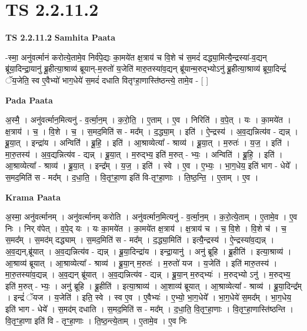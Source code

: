 \documentclass[17pt]{extarticle}
\begin{document}
\section{ TS 2.2.11.2 }

\textbf{TS 2.2.11.2 } \newline
\textbf{Samhita Paata} \newline

-स्मा॒ अनु॑वर्त्मानं करोत्ये॒तामे॒व निर्व॑पे॒द्यः का॒मये॑त क्ष॒त्राय॑ च वि॒शे च॑ स॒मदं॑ दद्ध्या॒मित्यै॒न्द्रस्या॑-व॒द्यन् ब्रू॑या॒दिन्द्रा॒यानु॑ ब्रू॒हीत्या॒श्राव्य॑ ब्रूयान्-म॒रुतो॑ य॒जेति॑ मारु॒तस्या॑व॒द्यन् ब्रू॑यान्म॒रुद्भ्योऽनु॑ ब्रू॒हीत्या॒श्राव्य॑ ब्रूया॒दिन्द्रं॑ ॅय॒जेति॒ स्व ए॒वैभ्यो॑ भाग॒धेये॑ स॒मदं॑ दधाति वितृꣳहा॒णास्ति॑ष्ठन्त्ये॒ तामे॒व - [  ] \newline

\textbf{Pada Paata} \newline

अ॒स्मै॒ । अनु॑वर्त्मान॒मित्यनु॑ - व॒र्त्मा॒न॒म् । क॒रो॒ति॒ । ए॒ताम् । ए॒व । निरिति॑ । व॒पे॒त् । यः । का॒मये॑त । क्ष॒त्राय॑ । च॒ । वि॒शे । च॒ । स॒मद॒मिति॑ स - मद᳚म् । द॒द्ध्या॒म् । इति॑ । ऐ॒न्द्रस्य॑ । अ॒व॒द्यन्नित्य॑व - द्यन्न् । ब्रू॒या॒त् । इन्द्रा॑य । अन्विति॑॑ । ब्रू॒हि॒ । इति॑ । आ॒श्राव्येत्या᳚ - श्राव्य॑ । ब्रू॒या॒त् । म॒रुतः॑ । य॒ज॒ । इति॑ । मा॒रु॒तस्य॑ । अ॒व॒द्यन्नित्य॑व - द्यन्न् । ब्रू॒या॒त् । म॒रुद्भ्य॒ इति॑ म॒रुत् - भ्यः॒ । अन्विति॑ । ब्रू॒हि॒ । इति॑ । आ॒श्राव्येत्या᳚ - श्राव्य॑ । ब्रू॒या॒त् । इन्द्र᳚म् । य॒ज॒ । इति॑ । स्वे । ए॒व । ए॒भ्यः॒ । भा॒ग॒धेय॒ इति॑ भाग - धेये᳚ । स॒मद॒मिति॑ स - मद᳚म् । द॒धा॒ति॒ । वि॒तृꣳ॒॒हा॒णा इति॑ वि-तृꣳ॒॒हा॒णाः । ति॒ष्ठ॒न्ति॒ । ए॒ताम् । ए॒व ।  \newline


\textbf{Krama Paata} \newline

अ॒स्मा॒ अनु॑वर्त्मानम् । अनु॑वर्त्मानम् करोति । अनु॑वर्त्मान॒मित्यनु॑ - व॒र्त्मा॒न॒म् । क॒रो॒त्ये॒ताम् । ए॒तामे॒व । ए॒व निः । निर् व॑पेत् । व॒पे॒द् यः । यः का॒मये॑त । का॒मये॑त क्ष॒त्राय॑ । क्ष॒त्राय॑ च । च॒ वि॒शे । वि॒शे च॑ । च॒ स॒मद᳚म् । स॒मद॑म् दद्ध्याम् । स॒मद॒मिति॑ स - मद᳚म् । द॒द्ध्या॒मिति॑ । इत्यै॒न्द्रस्य॑ । ऐ॒न्द्रस्या॑व॒द्यन्न् । अ॒व॒द्यन्,ब्रू॑यात् । अ॒व॒द्यन्नित्य॑व - द्यन्न् । ब्रू॒या॒दिन्द्रा॑य । इन्द्रा॒यानु॑ । अनु॑ ब्रूहि । ब्रू॒हीति॑ । इत्या॒श्राव्य॑ । आ॒श्राव्य॑ ब्रूयात् । आ॒श्राव्येत्या᳚ - श्राव्य॑ । ब्रू॒या॒न् म॒रुतः॑ । म॒रुतो॑ यज । य॒जेति॑ । इति॑ मारु॒तस्य॑ । मा॒रु॒तस्या॑व॒द्यन्न् । अ॒व॒द्यन् ब्रू॑यात् । अ॒व॒द्यन्नित्य॑व - द्यन्न् । ब्रू॒या॒न् म॒रुद्भ्यः॑ । म॒रुद्भ्यो ऽनु॑ । म॒रुद्भ्य॒ इति॑ म॒रुत् - भ्यः॒ । अनु॑ ब्रूहि । ब्रू॒हीति॑ । इत्या॒श्राव्य॑ । आ॒शाव्य॑ ब्रूयात् । आ॒श्राव्येत्या᳚ - श्राव्य॑ । ब्रू॒या॒दिन्द्र᳚म् । इन्द्रं॑ ॅयज । य॒जेति॑ । इति॒ स्वे । स्व ए॒व । ए॒वैभ्यः॑ । ए॒भ्यो॒ भा॒ग॒धेये᳚ । भा॒ग॒धेये॑ स॒मद᳚म् । भा॒ग॒धेय॒ इति॑ भाग - धेये᳚ । स॒मद॑म् दधाति । स॒मद॒मिति॑ स - मद᳚म् । द॒धा॒ति॒ वि॒तृꣳ॒॒हा॒णाः । वि॒तृꣳ॒॒हा॒णास्ति॑ष्ठन्ति । वि॒तृꣳ॒॒हा॒णा इति॑ वि - तृꣳ॒॒हा॒णाः । ति॒ष्ठ॒न्त्ये॒ताम् । ए॒तामे॒व । ए॒व निः \newline
\end{document}
